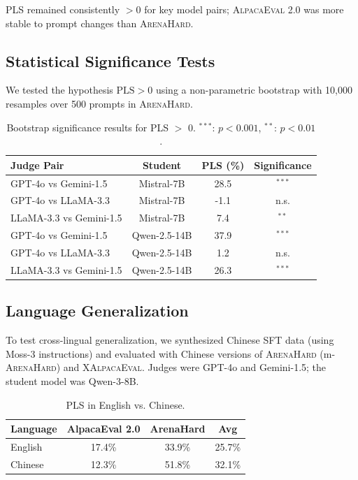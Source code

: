 \documentclass{article} %
\begin{document}
PLS remained consistently $>0$ for key model pairs; \textsc{AlpacaEval 2.0} was more stable to prompt changes than \textsc{ArenaHard}.

\subsection{Statistical Significance Tests}
\label{app:significance}
We tested the hypothesis $\mathrm{PLS} > 0$ using a non-parametric bootstrap with 10{,}000 resamples over 500 prompts in \textsc{ArenaHard}.

\begin{table}[h]
\centering
\caption{Bootstrap significance results for PLS $>$ 0. $^{***}$: $p<0.001$, $^{**}$: $p<0.01$.}
\small
\begin{tabular}{lccc}
\toprule
Judge Pair & Student & PLS (\%) & Significance \\
\midrule
GPT-4o vs Gemini-1.5 & Mistral-7B & 28.5 & $^{***}$ \\
GPT-4o vs LLaMA-3.3 & Mistral-7B & -1.1 & n.s. \\
LLaMA-3.3 vs Gemini-1.5 & Mistral-7B & 7.4 & $^{**}$ \\
GPT-4o vs Gemini-1.5 & Qwen-2.5-14B & 37.9 & $^{***}$ \\
GPT-4o vs LLaMA-3.3 & Qwen-2.5-14B & 1.2 & n.s. \\
LLaMA-3.3 vs Gemini-1.5 & Qwen-2.5-14B & 26.3 & $^{***}$ \\
\bottomrule
\end{tabular}
\end{table}

\subsection{Language Generalization}
\label{app:chinese_generalization}
To test cross-lingual generalization, we synthesized Chinese SFT data (using Moss-3 instructions) and evaluated with Chinese versions of \textsc{ArenaHard} (m-\textsc{ArenaHard}) and \textsc{XAlpacaEval}. Judges were GPT-4o and Gemini-1.5; the student model was Qwen-3-8B.

\begin{table}[h]
\centering
\caption{PLS in English vs. Chinese.}
\small
\begin{tabular}{lccc}
\toprule
Language & AlpacaEval 2.0 & ArenaHard & Avg \\
\midrule
English & 17.4\% & 33.9\% & 25.7\% \\
Chinese & 12.3\% & 51.8\% & 32.1\% \\
\bottomrule
\end{tabular}
\end{table}
\end{document}
